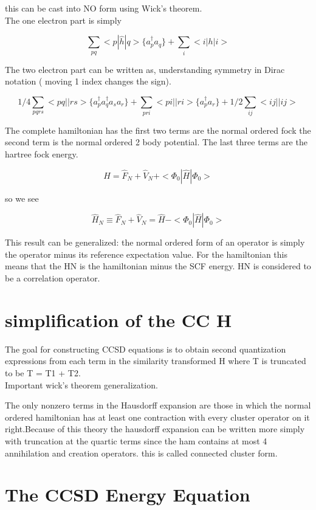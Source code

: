 \documentclass[10pt, draft]{article}
\begin{document}
this can be cast into NO form using Wick's theorem.\\
The one electron part is simply

\[ \sum_{pq} <p|\hat{h}|q>\{a_p^\dagger a_q\} + \sum_i <i|h|i> \]

The two electron part can be written as, understanding symmetry in Dirac notation ( moving 1 index changes the sign).

\[ 1/4 \sum_{pqrs} <pq||rs> \{a_p^\dagger a_q^\dagger a_s a_r\} + \sum_{pri} <pi||ri> \{a_p ^\dagger a_r\} + 1/2 \sum_{ij} <ij||ij> \]

The complete hamiltonian has the first two terms are the normal ordered fock the second term is the normal ordered 2 body potential.  The last three terms are the hartree fock energy.

\[ \hat{H} = \hat{F}_N + \hat{V}_N + <\Phi_0|\hat{H}|\Phi_0> \]

so we see

\[\hat{H}_N \equiv  \hat{F}_N + \hat{V}_N = \hat{H} - <\Phi_0|\hat{H}|\Phi_0> \]

This result can be generalized: the normal ordered form of an operator is simply the operator minus its reference expectation value.  For the hamiltonian this means that the HN is the hamiltonian minus the SCF energy.  HN is considered to be a correlation operator.  

\section{simplification of the CC H}
The goal for constructing CCSD equations is to obtain second quantization expressions from each term in the similarity transformed H where T is truncated to be T = T1 + T2.  \\
Important wick's theorem generalization.\linebreak[1]

The only nonzero terms in the Hausdorff expansion are those in which the normal ordered hamiltonian has at least one contraction with every cluster operator on it right.\linebreak[1]
Because of this theory the hausdorff expansion can be written more simply with truncation at the quartic terms since the ham contains at most 4 annihilation and creation operators.  this is called connected cluster form.  

\section{The CCSD Energy Equation}
\end{document}
